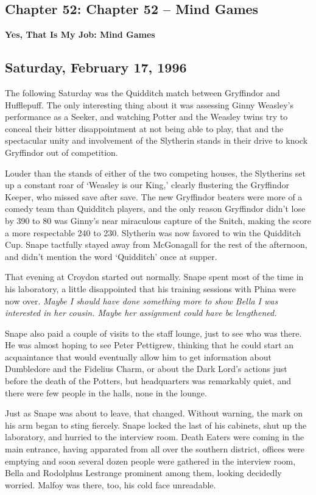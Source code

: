\documentclass[a4paper,11pt]{article}
\begin{document}
\subsection{Chapter 52: Chapter 52 – Mind Games}

\textbf{Yes, That Is My Job: Mind Games}

\subsection{Saturday, February 17, 1996}

The following Saturday was the Quidditch match between Gryffindor and Hufflepuff. The only interesting thing about it was assessing Ginny Weasley's performance as a Seeker, and watching Potter and the Weasley twins try to conceal their bitter disappointment at not being able to play, that and the spectacular unity and involvement of the Slytherin stands in their drive to knock Gryffindor out of competition.

Louder than the stands of either of the two competing houses, the Slytherins set up a constant roar of `Weasley is our King,' clearly flustering the Gryffindor Keeper, who missed save after save. The new Gryffindor beaters were more of a comedy team than Quidditch players, and the only reason Gryffindor didn't lose by 390 to 80 was Ginny's near miraculous capture of the Snitch, making the score a more respectable 240 to 230. Slytherin was now favored to win the Quidditch Cup. Snape tactfully stayed away from McGonagall for the rest of the afternoon, and didn't mention the word `Quidditch' once at supper.

That evening at Croydon started out normally. Snape spent most of the time in his laboratory, a little disappointed that his training sessions with Phina were now over. \emph{Maybe I should have done something more to show Bella I was interested in her cousin. Maybe her assignment could have be lengthened.}

Snape also paid a couple of visits to the staff lounge, just to see who was there. He was almost hoping to see Peter Pettigrew, thinking that he could start an acquaintance that would eventually allow him to get information about Dumbledore and the Fidelius Charm, or about the Dark Lord's actions just before the death of the Potters, but headquarters was remarkably quiet, and there were few people in the halls, none in the lounge.

Just as Snape was about to leave, that changed. Without warning, the mark on his arm began to sting fiercely. Snape locked the last of his cabinets, shut up the laboratory, and hurried to the interview room. Death Eaters were coming in the main entrance, having apparated from all over the southern district, offices were emptying and soon several dozen people were gathered in the interview room, Bella and Rodolphus Lestrange prominent among them, looking decidedly worried. Malfoy was there, too, his cold face unreadable.
\end{document}
